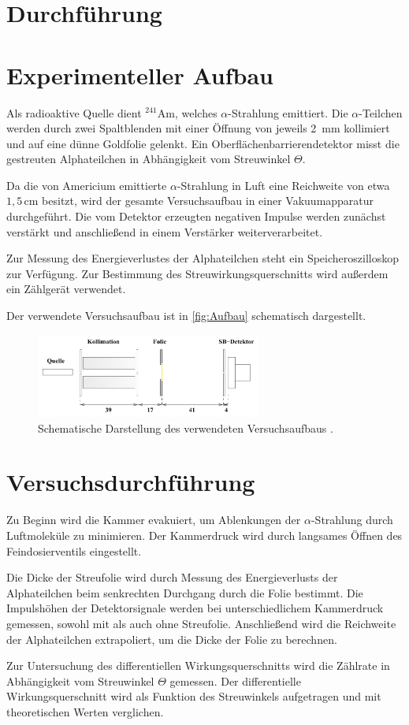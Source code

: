 \section{Durchführung}
\section*{Experimenteller Aufbau}

Als radioaktive Quelle dient $^{241}\mathrm{Am}$, welches $\alpha$-Strahlung emittiert. Die $\alpha$-Teilchen werden durch zwei Spaltblenden mit einer Öffnung von jeweils 2 $\, \unit{\milli \meter}$ kollimiert und auf eine dünne Goldfolie gelenkt. Ein Oberflächenbarrierendetektor misst die gestreuten Alphateilchen in Abhängigkeit vom Streuwinkel $\Theta$. 

Da die von Americium emittierte $\alpha$-Strahlung in Luft eine Reichweite von etwa $1,5 \, \unit{\centi \meter}$ besitzt, wird der gesamte Versuchsaufbau in einer Vakuumapparatur durchgeführt. Die vom Detektor erzeugten negativen Impulse werden zunächst verstärkt und anschließend in einem Verstärker weiterverarbeitet. 

Zur Messung des Energieverlustes der Alphateilchen steht ein Speicheroszilloskop zur Verfügung. Zur Bestimmung des Streuwirkungsquerschnitts wird außerdem ein Zählgerät verwendet.

Der verwendete Versuchsaufbau ist in \autoref{fig:Aufbau} schematisch dargestellt.
\begin{figure}
	\centering
	\includegraphics[width=0.66\textwidth]{content/grafik/Aufbau.pdf}
	\caption{Schematische Darstellung des verwendeten Versuchsaufbaus \cite{rutherford}.}
	\label{fig:Aufbau}
\end{figure}

\section*{Versuchsdurchführung}

Zu Beginn wird die Kammer evakuiert, um Ablenkungen der $\alpha$-Strahlung durch Luftmoleküle zu minimieren. Der Kammerdruck wird durch langsames Öffnen des Feindosierventils eingestellt.

Die Dicke der Streufolie wird durch Messung des Energieverlusts der Alphateilchen beim senkrechten Durchgang durch die Folie bestimmt. Die Impulshöhen der Detektorsignale werden bei unterschiedlichem Kammerdruck gemessen, sowohl mit als auch ohne Streufolie. Anschließend wird die Reichweite der Alphateilchen extrapoliert, um die Dicke der Folie zu berechnen.

Zur Untersuchung des differentiellen Wirkungsquerschnitts wird die Zählrate in Abhängigkeit vom Streuwinkel $\Theta$ gemessen. Der differentielle Wirkungsquerschnitt wird als Funktion des Streuwinkels aufgetragen und mit theoretischen Werten verglichen. 

